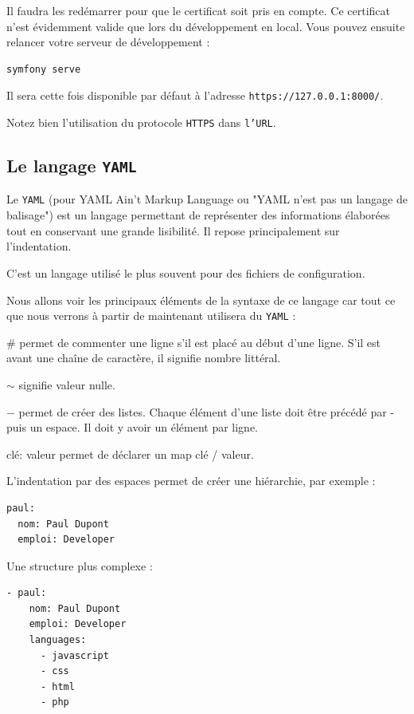 \documentclass{article}
\begin{document}
Il faudra les redémarrer pour que le certificat soit pris en compte. Ce certificat n'est évidemment valide que lors du développement en local. Vous pouvez ensuite relancer votre serveur de développement :

\begin{verbatim}
symfony serve
\end{verbatim}

Il sera cette fois disponible par défaut à l'adresse {\tt https://127.0.0.1:8000/}.

Notez bien l'utilisation du protocole {\tt HTTPS} dans {\tt l'URL}.

\subsection{Le langage {\tt YAML}}
Le {\tt YAML} (pour YAML Ain't Markup Language ou "YAML n'est pas un langage de balisage") est un langage permettant de représenter des informations élaborées tout en conservant une grande lisibilité. Il repose principalement sur l'indentation.

C'est un langage utilisé le plus souvent pour des fichiers de configuration.

Nous allons voir les principaux éléments de la syntaxe de ce langage car tout ce que nous verrons à partir de maintenant utilisera du {\tt YAML} :

\# permet de commenter une ligne s'il est placé au début d'une ligne. S'il est avant une chaîne de caractère, il signifie nombre littéral.

$\sim$ signifie valeur nulle.

$-$ permet de créer des listes. Chaque élément d'une liste doit être précédé par - puis un espace. Il doit y avoir un élément par ligne.

clé: valeur permet de déclarer un map clé / valeur.

L'indentation par des espaces permet de créer une hiérarchie, par exemple :

\begin{verbatim}
paul:
  nom: Paul Dupont
  emploi: Developer
\end{verbatim}

Une structure plus complexe :
\begin{verbatim}
- paul:
    nom: Paul Dupont
    emploi: Developer
    languages:
      - javascript
      - css
      - html
      - php
\end{verbatim}
\end{document}
